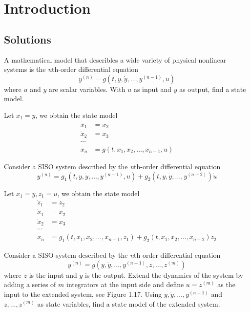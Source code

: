 \chapter{Introduction}

\section{Solutions}
\begin{exer}
A mathematical model that describles a wide variety of physical nonlinear systems is the 
\textit{n}th-order differential equation
\begin{equation*}
y^{(n)}=g\left(t,y,\dot{y},\dots,y^{(n-1)},u\right)
\end{equation*}
where $u$ and $y$ are scalar variables. With $u$ as input and $y$ as output, find a state model.
\end{exer}
 
\begin{solution}
Let $x_1=y$, we obtain the state model
\begin{align*}
\dot{x}_1 & = x_2\\ 
\dot{x}_2 & = x_3\\
\cdots \\
\dot{x}_n & = g(t,x_1,x_2,\dots,x_{n-1},u)
\end{align*}
\end{solution}

\begin{exer}
Consider a SISO system described by the \textit{n}th-order differential equation
\begin{equation*}
y^{(n)}=g_1\left(t,y,\dot{y},\dots,y^{(n-1)},u\right)+g_2\left(t,y,\dot{y},\dots,y^{(n-2)}\right)\dot{u}
\end{equation*}
\end{exer} 

\begin{solution}
Let $x_1=y,z_1=u$, we obtain the state model
\begin{align*}
\dot{z}_1 & = z_2\\
\dot{x}_1 & = x_2\\ 
\dot{x}_2 & = x_3\\
\cdots \\
\dot{x}_n & = g_1(t,x_1,x_2,\dots,x_{n-1},z_1)+g_2(t,x_1,x_2,\dots,x_{n-2})z_2
\end{align*}
\end{solution}

\begin{exer}
Consider a SISO system described by the \textit{n}th-order differential equation
\begin{equation*}
y^{(n)}=g\left(y,\dot{y},\dots,y^{(n-1)},z,\dots,z^{(m)}\right)
\end{equation*}
where $z$ is the input and $y$ is the output. Extend the dynamics of the system by 
adding a series of $m$ integrators at the input side and define $u=z^{(m)}$ as the
input to the extended system, see Figure 1.17. Using $y,\dot{y},\dots,y^{(n-1)}$ 
and $z,\dots,z^{(m)}$ as state variables, find a state model of the extended system.
\end{exer}

